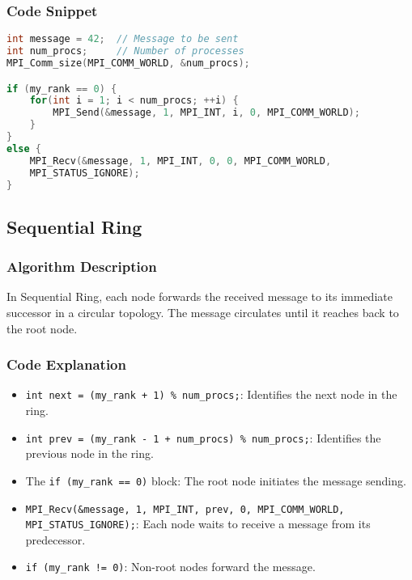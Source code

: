 \documentclass[11pt]{article}
\begin{document}
\subsubsection{Code Snippet}
\begin{lstlisting}[language=C++, caption=Key part of Sequential Broadcast]
int message = 42;  // Message to be sent
int num_procs;     // Number of processes
MPI_Comm_size(MPI_COMM_WORLD, &num_procs);

if (my_rank == 0) {
    for(int i = 1; i < num_procs; ++i) {
        MPI_Send(&message, 1, MPI_INT, i, 0, MPI_COMM_WORLD);
    }
}
else {
    MPI_Recv(&message, 1, MPI_INT, 0, 0, MPI_COMM_WORLD, 
    MPI_STATUS_IGNORE);
}
\end{lstlisting}

\subsection{Sequential Ring}

\subsubsection{Algorithm Description}
In Sequential Ring, each node forwards the received message to its immediate successor in a circular topology. The message circulates until it reaches back to the root node.

\subsubsection{Code Explanation}

\begin{itemize}
    \item \texttt{int next = (my\_rank + 1) \% num\_procs;}: Identifies the next node in the ring.
    \item \texttt{int prev = (my\_rank - 1 + num\_procs) \% num\_procs;}: Identifies the previous node in the ring.
    \item The \texttt{if (my\_rank == 0)} block: The root node initiates the message sending.
    \item \texttt{MPI\_Recv(\&message, 1, MPI\_INT, prev, 0, MPI\_COMM\_WORLD, MPI\_STATUS\_IGNORE);}: Each node waits to receive a message from its predecessor.
    \item \texttt{if (my\_rank != 0)}: Non-root nodes forward the message.
\end{itemize}
\end{document}
